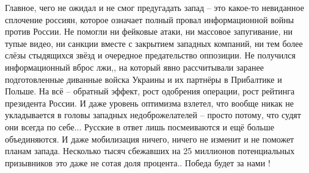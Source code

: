 Главное, чего не ожидал и не смог предугадать запад – это какое-то невиданное сплочение россиян, которое означает полный провал информационной войны против России.
Не помогли ни фейковые атаки, ни массовое запугивание, ни тупые видео, ни санкции вместе с закрытием западных компаний, ни тем более слёзы стыдящихся звёзд и очередное предательство оппозиции. Не получился информационный вброс лжи,, на который явно рассчитывали заранее подготовленные диванные войска Украины и их партнёры в Прибалтике и Польше. На всё – обратный эффект, рост одобрения операции, рост рейтинга президента России. И даже уровень оптимизма взлетел, что вообще никак не укладывается в головы западных недоброжелателей – просто потому, что судят они всегда по себе... Русские в ответ лишь посмеиваются и ещё больше объединяются.
И даже мобилизация ничего, ничего не изменит и не поможет планам запада. Несколько тысяч сбежавших на 25 миллионов потенциальных призывников это даже не сотая доля процента.. Победа будет за нами !

